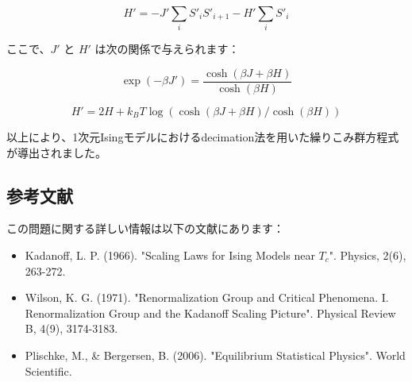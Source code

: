 \documentclass[a4paper,10pt]{ltjsarticle} %
\begin{document}
\[
H' = -J' \sum_{i} S'_i S'_{i+1} - H' \sum_i S'_i
\]

ここで、\( J' \) と \( H' \) は次の関係で与えられます：

\[
\exp(-\beta J') = \frac{\cosh(\beta J + \beta H)}{\cosh(\beta H)}
\]

\[
H' = 2H + k_B T \log\left( \cosh(\beta J + \beta H) / \cosh(\beta H) \right)
\]

以上により、1次元Isingモデルにおけるdecimation法を用いた繰りこみ群方程式が導出されました。

\subsection*{参考文献}

この問題に関する詳しい情報は以下の文献にあります：

\begin{itemize}
    \item Kadanoff, L. P. (1966). "Scaling Laws for Ising Models near \( T_c \)". Physics, 2(6), 263-272.
    \item Wilson, K. G. (1971). "Renormalization Group and Critical Phenomena. I. Renormalization Group and the Kadanoff Scaling Picture". Physical Review B, 4(9), 3174-3183.
    \item Plischke, M., \& Bergersen, B. (2006). "Equilibrium Statistical Physics". World Scientific.
\end{itemize}
\end{document}
